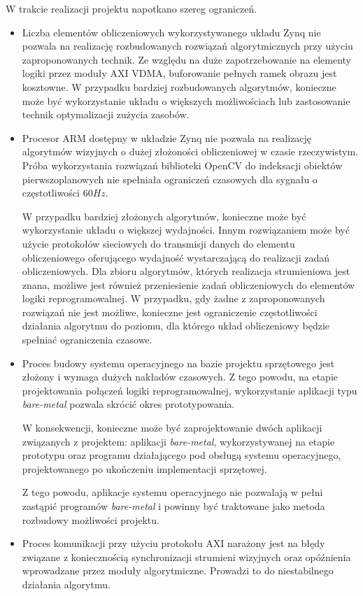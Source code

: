 W trakcie realizacji projektu napotkano szereg ograniczeń. 
\begin{itemize}
	\item Liczba elementów obliczeniowych wykorzystywanego układu Zynq nie pozwala na realizację rozbudowanych rozwiązań algorytmicznych przy użyciu zaproponowanych technik. 
	Ze względu na duże zapotrzebowanie na elementy logiki przez moduły AXI VDMA, buforowanie pełnych ramek obrazu jest kosztowne. 
	W przypadku bardziej rozbudowanych algorytmów, konieczne może być wykorzystanie układu o większych możliwościach lub zastosowanie technik optymalizacji zużycia zasobów.
	
	\item Procesor ARM dostępny w układzie Zynq nie pozwala na realizację algorytmów wizyjnych o dużej złożoności obliczeniowej w  czasie rzeczywistym. 
	Próba wykorzystania rozwiązań biblioteki OpenCV do indeksacji obiektów pierwszoplanowych nie spełniała ograniczeń czasowych dla sygnału o częstotliwości $60Hz$.
	
	W przypadku bardziej złożonych algorytmów, konieczne może być wykorzystanie układu o większej wydajności. 
	Innym rozwiązaniem może być użycie protokołów sieciowych do transmisji danych do elementu obliczeniowego oferującego wydajność wystarczającą do realizacji zadań obliczeniowych. 
	Dla zbioru algorytmów, których realizacja strumieniowa jest znana, możliwe jest również przeniesienie zadań obliczeniowych do elementów logiki reprogramowalnej. 
	W przypadku, gdy żadne z zaproponowanych rozwiązań nie jest możliwe, konieczne jest ograniczenie częstotliwości działania algorytmu do poziomu, dla którego układ obliczeniowy będzie spełniać ograniczenia czasowe.
	
	\item Proces budowy systemu operacyjnego na bazie projektu sprzętowego jest złożony i wymaga dużych nakładów czasowych. 
	Z tego powodu, na etapie projektowania połączeń logiki reprogramowalnej, wykorzystanie aplikacji typu \textit{bare-metal} pozwala skrócić okres prototypowania.
	
	W konsekwencji, konieczne może być zaprojektowanie dwóch aplikacji związanych z projektem: aplikacji \textit{bare-metal}, wykorzystywanej na etapie prototypu oraz programu działającego pod obsługą systemu operacyjnego, projektowanego po ukończeniu implementacji sprzętowej.
	
	Z tego powodu, aplikacje systemu operacyjnego nie pozwalają w pełni zastąpić programów \textit{bare-metal} i powinny być traktowane jako metoda rozbudowy możliwości projektu.
	
	\item Proces komunikacji przy użyciu protokołu AXI narażony jest na błędy związane z koniecznością synchronizacji strumieni wizyjnych oraz opóźnienia wprowadzane przez moduły algorytmiczne. Prowadzi to do niestabilnego działania algorytmu.
\end{itemize}

